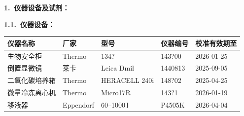 \documentclass[UTF8,10pt,a4paper,fontset=fandol]{ctexart}
\newcommand{\fieldvalue}[1]{#1}
\newcommand{\handwritten}[1]{#1}
\begin{document}
\textbf{1.\ 仪器设备及试剂：}

\textbf{1.1.\ 仪器设备：}

\small
\begin{tabularx}{\textwidth}{|X|X|X|X|X|}
\hline
仪器名称 & 厂家 & 型号 & 仪器编号 & 校准有效期至 \\ \hline
生物安全柜 &
\fieldvalue{Thermo} &
\fieldvalue{\handwritten{134?}} &
\fieldvalue{\handwritten{143?00}} &
\fieldvalue{\handwritten{2026-01-25}} \\ \hline
倒置显微镜 &
\fieldvalue{莱卡} &
\fieldvalue{Leica Dmil} &
\fieldvalue{\handwritten{1440813}} &
\fieldvalue{\handwritten{2025-09-05}} \\ \hline
二氧化碳培养箱 &
\fieldvalue{Thermo} &
\fieldvalue{HERACELL 240i} &
\fieldvalue{\handwritten{148?02}} &
\fieldvalue{\handwritten{2025-04-25}} \\ \hline
微量冷冻离心机 &
\fieldvalue{Thermo} &
\fieldvalue{Micro17R} &
\fieldvalue{\handwritten{143?1}} &
\fieldvalue{\handwritten{2026-01-19}} \\ \hline
移液器 &
\fieldvalue{Eppendorf} &
\fieldvalue{\handwritten{60--1000\,\textmu l}} &
\fieldvalue{\handwritten{P4505K}} &
\fieldvalue{\handwritten{2026-04-04}} \\ \hline
\end{tabularx}
\normalsize
\end{document}
